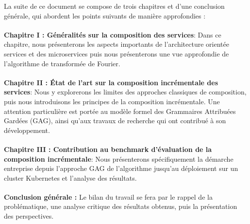 La suite de ce document se compose de trois chapitres et d'une conclusion générale, qui abordent les points suivants de manière approfondies :\\
\\
\textbf{Chapitre I : Généralités sur la composition des services}: Dans ce chapitre, nous présenterons les aspects importants de l'architecture orientée services et des microservices puis nous présenterons une vue approfondie de l'algorithme de transformée de Fourier.
\\
\\
\textbf{Chapitre II : État de l’art sur la composition incrémentale des services}: Nous y explorerons les limites des approches classiques de composition, puis nous introduisons les principes de la composition incrémentale. Une attention particulière est portée au modèle formel des Grammaires Attribuées Gardées (GAG), ainsi qu’aux travaux de recherche qui ont contribué à son développement.
\\
\\
\textbf{Chapitre III : Contribution au benchmark d’évaluation de la composition incrémentale}: Nous présenterons spécifiquement la démarche entreprise depuis l'approche GAG de l'algorithme jusqu'au déploiement sur un cluster Kubernetes et l'analyse des résultats.
\\
\\
\textbf{Conclusion générale :} Le bilan du travail se fera par le rappel de la problématique, une analyse critique des résultats obtenus, puis la présentation des perspectives.

\myCleanStarChapterEnd
